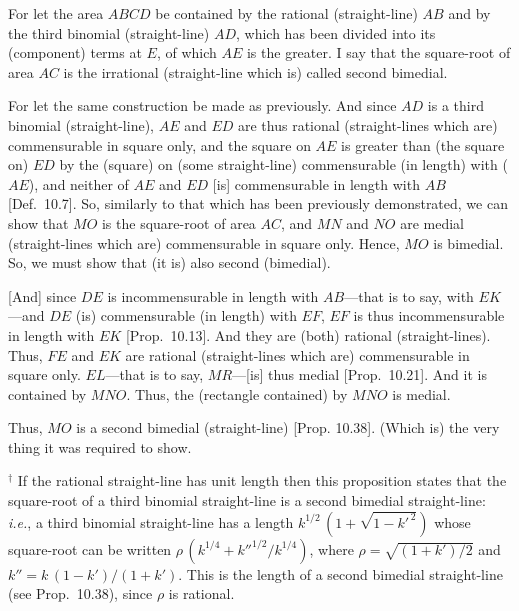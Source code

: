 \begin{Parallel}{}{}
{For let the area $ABCD$ be contained by the rational (straight-line)
$AB$ and by the third binomial (straight-line) $AD$, which has been divided into
its (component) terms at $E$, of which $AE$ is the greater.  I say that
the square-root of area $AC$ is the irrational (straight-line which is)
called second bimedial.

For let the same construction be made as  previously. And since
$AD$ is a third binomial (straight-line), $AE$ and $ED$
are thus rational (straight-lines which are) commensurable in square only,
and the square on $AE$ is greater than (the square on) $ED$
by the (square) on (some straight-line) commensurable (in length) with
($AE$), and neither of $AE$ and $ED$ [is] commensurable in length
with $AB$ [Def.~10.7]. So, similarly
to that which has been previously demonstrated, we can show that
$MO$ is the square-root of  area $AC$, and $MN$ and $NO$
are medial (straight-lines which are) commensurable in square only.
Hence, $MO$ is bimedial. So, we must show that (it is)
also second (bimedial).

\mbox{[}And] since $DE$ is incommensurable in length with $AB$---that is to say,
with $EK$---and $DE$ (is) commensurable (in length) with $EF$,
$EF$ is thus incommensurable in length with $EK$ [Prop.~10.13]. And they are (both)
rational (straight-lines). Thus, $FE$ and $EK$ are rational (straight-lines which are) commensurable in square only. $EL$---that is to say, $MR$---[is] thus medial [Prop.~10.21]. And it
is contained by $MNO$.  Thus, the (rectangle contained) by $MNO$
is medial.

Thus, $MO$ is a second bimedial (straight-line) [Prop. 10.38]. (Which is) the very thing it was required to show.}
\end{Parallel}
{\footnotesize\noindent $^\dag$ If the rational straight-line has unit length then this proposition states that the square-root of 
a third binomial straight-line is a second bimedial straight-line: {\em i.e.}, 
a third binomial straight-line has a length $k^{1/2}\,(1+\sqrt{1-k'^{\,2}})$ whose
square-root can be written $\rho\,(k^{1/4}+k''^{1/2}/k^{1/4})$, where $\rho=\sqrt{(1+k')/2}$ and $k''=k\,(1-k')/(1+k')$. This is the length of a second bimedial straight-line (see Prop.~10.38), since $\rho$ is rational.}

